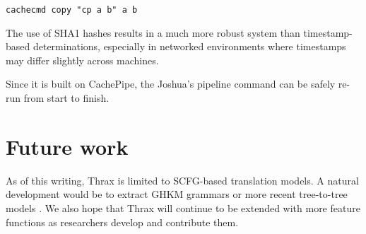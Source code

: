 \documentclass[11pt]{article}
\begin{document}
\verb|cachecmd copy "cp a b" a b|

\noindent The use of SHA1 hashes results in a much more robust system than
timestamp-based determinations, especially in networked environments
where timestamps may differ slightly across machines.

Since it is built on CachePipe, the Joshua's pipeline command can be
safely re-run from start to finish.

\section{Future work}

As of this writing, Thrax is limited to SCFG-based translation models.
A natural development would be to extract GHKM grammars
\cite{galley2004whats} or more recent tree-to-tree models
\cite{zhang2008,liu2009,chiang2010}.  We also hope that Thrax will
continue to be extended with more feature functions as researchers
develop and contribute them.




\end{document}
